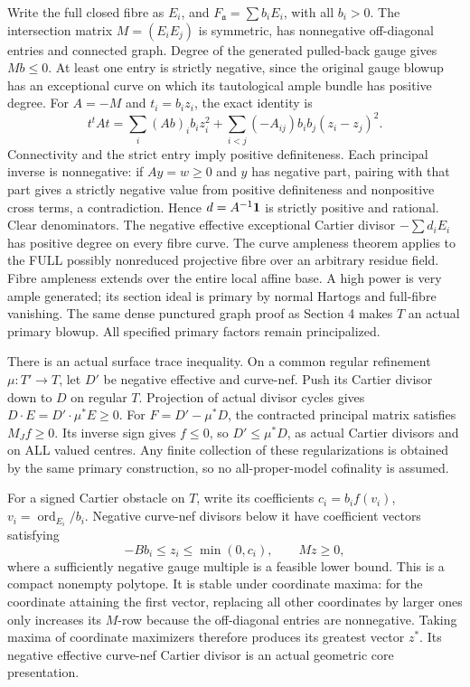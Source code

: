 \documentclass[11pt]{article}
\begin{document}
Write the full closed fibre as \(E_i\), and \(F_{\mathfrak a}=\sum b_iE_i\), with all \(b_i>0\). The intersection matrix \(M=(E_iE_j)\) is symmetric, has nonnegative off-diagonal entries and connected graph. Degree of the generated pulled-back gauge gives \(Mb\le0\). At least one entry is strictly negative, since the original gauge blowup has an exceptional curve on which its tautological ample bundle has positive degree. For \(A=-M\) and \(t_i=b_i z_i\), the exact identity is
\[
t^tAt=\sum_i (Ab)_i b_i z_i^2+
\sum_{i<j}(-A_{ij})b_i b_j(z_i-z_j)^2.
\]
Connectivity and the strict entry imply positive definiteness. Each principal inverse is nonnegative: if \(Ay=w\ge0\) and \(y\) has negative part, pairing with that part gives a strictly negative value from positive definiteness and nonpositive cross terms, a contradiction. Hence \(d=A^{-1}{\bf1}\) is strictly positive and rational. Clear denominators. The negative effective exceptional Cartier divisor \(-\sum d_iE_i\) has positive degree on every fibre curve. The curve ampleness theorem applies to the FULL possibly nonreduced projective fibre over an arbitrary residue field. Fibre ampleness extends over the entire local affine base. A high power is very ample generated; its section ideal is primary by normal Hartogs and full-fibre vanishing. The same dense punctured graph proof as Section 4 makes \(T\) an actual primary blowup. All specified primary factors remain principalized.

There is an actual surface trace inequality. On a common regular refinement \(\mu:T'\to T\), let \(D'\) be negative effective and curve-nef. Push its Cartier divisor down to \(D\) on regular \(T\). Projection of actual divisor cycles gives \(D\cdot E=D'\cdot\mu^*E\ge0\). For \(F=D'-\mu^*D\), the contracted principal matrix satisfies \(M_J f\ge0\). Its inverse sign gives \(f\le0\), so \(D'\le\mu^*D\), as actual Cartier divisors and on ALL valued centres. Any finite collection of these regularizations is obtained by the same primary construction, so no all-proper-model cofinality is assumed.

For a signed Cartier obstacle on \(T\), write its coefficients \(c_i=b_i f(v_i)\), \(v_i=\operatorname{ord}_{E_i}/b_i\). Negative curve-nef divisors below it have coefficient vectors satisfying
\[
-B b_i\le z_i\le\min(0,c_i),\qquad Mz\ge0,
\]
where a sufficiently negative gauge multiple is a feasible lower bound. This is a compact nonempty polytope. It is stable under coordinate maxima: for the coordinate attaining the first vector, replacing all other coordinates by larger ones only increases its \(M\)-row because the off-diagonal entries are nonnegative. Taking maxima of coordinate maximizers therefore produces its greatest vector \(z^*\). Its negative effective curve-nef Cartier divisor is an actual geometric core presentation.
\end{document}
